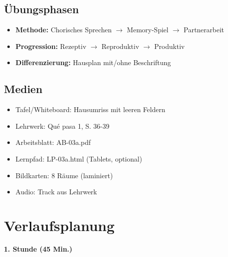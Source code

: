 \documentclass[11pt,a4paper]{article}
\newcommand{\lehrwerk}{Qué pasa 1}
\newcommand{\lehrwerkseite}{S. 36-39}
\begin{document}
\subsection{Übungsphasen}
\begin{itemize}
    \item \textbf{Methode:} Chorisches Sprechen $\rightarrow$ Memory-Spiel $\rightarrow$ Partnerarbeit
    \item \textbf{Progression:} Rezeptiv $\rightarrow$ Reproduktiv $\rightarrow$ Produktiv
    \item \textbf{Differenzierung:} Hausplan mit/ohne Beschriftung
\end{itemize}

\subsection{Medien}
\begin{itemize}
    \item Tafel/Whiteboard: Hausumriss mit leeren Feldern
    \item Lehrwerk: \lehrwerk, \lehrwerkseite
    \item Arbeitsblatt: AB-03a.pdf
    \item Lernpfad: LP-03a.html (Tablets, optional)
    \item Bildkarten: 8 Räume (laminiert)
    \item Audio: Track aus Lehrwerk
\end{itemize}

\section{Verlaufsplanung}

\textbf{1. Stunde (45 Min.)}
\end{document}
